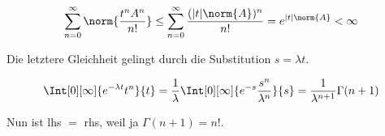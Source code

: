 \begin{solution}
\begin{align*}
  \sum_{n=0}^\infty
  \norm{\frac{t^n A^n}{n!}}
  \leq
  \sum_{n=0}^\infty
  \frac{(|t| \norm{A})^n}{n!}
  =
  e^{|t| \norm{A}} < \infty
\end{align*}

Die letztere Gleichheit gelingt durch die Substitution $s = \lambda t$.

\begin{align*}
  \Int[0][\infty]{e^{-\lambda t} t^n}{t}
  =
  \frac{1}{\lambda}
  \Int
  [0][\infty]
  {
    e^{-s}
    \frac{s^n}{\lambda^n}
  }{s}
  =
  \frac{1}{\lambda^{n + 1}}
  \Gamma(n+1)
\end{align*}

Nun ist lhs $=$ rhs, weil ja $\Gamma(n+1) = n!$.

\end{solution}

